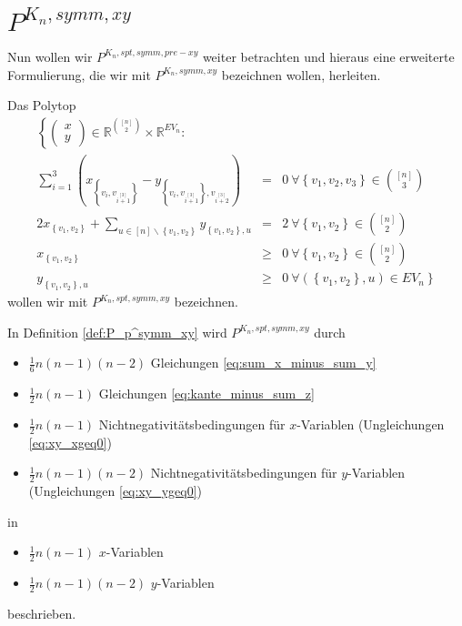 \documentclass[10p,a4paper,BCOR = 12mm, DIV=15]{scrbook}
\begin{document}
\section{$P^{K_n, symm, xy}$}

Nun wollen wir $P^{K_n, spt, symm, pre-xy}$ weiter betrachten und hieraus eine erweiterte Formulierung, die wir mit $P^{K_n, symm, xy}$ bezeichnen wollen, herleiten.

\begin{Def}
\label{def:P_p^symm_xy}
Das Polytop
\begin{eqnarray}
\left\{ \left(\begin{array}{c}
x \\
y
\end{array}\right)\in\mathbb{R}^{[n]\choose 2}\times \mathbb{R}^{EV_n}: \right.
\nonumber & & \\
\sum_{i=1}^3 \left(x_{\left\{v_{i}, v_{i \stackrel{\left[3\right]}{+} 1}\right\}} -  y_{\left\{v_{i}, v_{i \stackrel{\left[3\right]}{+} 1}\right\}, v_{i \stackrel{\left[3\right]}{+} 2}}\right) & = & 0\ \forall \left\{v_1, v_2, v_3\right\}\in {[n] \choose 3} \label{eq:sum_x_minus_sum_y} \\
2 x_{\left\{v_1, v_2\right\}} + \sum_{u\in[n]\backslash\left\{v_1, v_2\right\}} y_{\left\{v_1, v_2\right\}, u} & = & 2\ \forall \left\{v_1, v_2\right\}\in {[n] \choose 2} \label{eq:kante_minus_sum_z} \\
x_{\left\{v_1, v_2\right\}} & \geq & 0 \ \forall \left\{v_1, v_2\right\} \in {\left[n\right] \choose 2} \label{eq:xy_xgeq0} \\
y_{\left\{v_1, v_2\right\}, u} & \geq & \left.0 \ \forall \left(\left\{v_1, v_2\right\}, u\right) \in EV_n\right\} \label{eq:xy_ygeq0}
\end{eqnarray}
wollen wir mit $P^{K_n, spt, symm, xy}$ bezeichnen.
\end{Def}

\begin{Bem}
\label{bem:gleichungen_Pxy}
In Definition \ref{def:P_p^symm_xy} wird $P^{K_n, spt, symm, xy}$ durch
\begin{itemize}
\item $\frac{1}{6} n \left(n-1\right) \left(n-2\right)$ Gleichungen \eqref{eq:sum_x_minus_sum_y}
\item $\frac{1}{2} n \left(n-1\right)$ Gleichungen \eqref{eq:kante_minus_sum_z}
\item $\frac{1}{2} n \left(n-1\right)$ Nichtnegativitätsbedingungen für $x$-Variablen (Ungleichungen \eqref{eq:xy_xgeq0})
\item $\frac{1}{2} n \left(n-1\right) \left(n-2\right)$ Nichtnegativitätsbedingungen für $y$-Variablen (Ungleichungen \eqref{eq:xy_ygeq0})
\end{itemize}
in
\begin{itemize}
\item $\frac{1}{2} n \left(n-1\right)$ $x$-Variablen
\item $\frac{1}{2} n \left(n-1\right) \left(n-2\right)$ $y$-Variablen
\end{itemize}
beschrieben.
\end{Bem}
\end{document}
